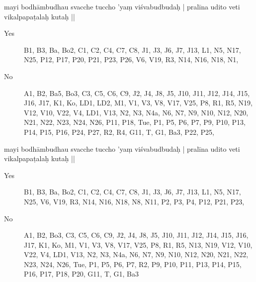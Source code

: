 \begin{ekdosis}
\begin{marma}[hp01_055]
 
mayi bodhāmbudhau svacche tuccho 'yaṃ viśvabudbudaḥ |
pralīna udito veti vikalpapaṭalaḥ kutaḥ ||

 \begin{description}
 \item[Yes] B1, B3, Ba, Bo2, C1, C2, C4, C7, C8, J1, J3, J6, J7, J13, L1, N5, N17, N25, P12, P17, P20, P21, P23, P26, V6, V19, R3, N14, N16, N18, N1, 

 \item[No] A1, B2, Ba5, Bo3, C3, C5, C6, C9, J2, J4, J8, J5, J10, J11, J12, J14, J15, J16, J17, K1, Ko, LD1, LD2, M1, V1, V3, V8, V17, V25, P8, R1, R5, N19, V12, V10, V22, V4, LD1, V13, N2, N3, N4a, N6, N7, N9, N10, N12, N20, N21, N22, N23, N24, N26, P11, P18, Tue, P1, P5, P6, P7, P9, P10, P13, P14, P15, P16, P24, P27, R2, R4, G11, T, G1, Ba3, P22, P25, 
    \end{description}

 
mayi bodhāmbudhau svacche tuccho 'yaṃ viśvabudbudaḥ |
pralīna udito veti vikalpapaṭalaḥ kutaḥ ||

\begin{description}
\item[Yes] B1, B3, Ba, Bo2, C1, C2, C4, C7, C8, J1, J3, J6, J7, J13, L1, N5, N17, N25, V6, V19, R3, N14, N16, N18, N8, N11, P2, P3, P4, P12, P21, P23, 
\item[No] A1, B2, Bo3, C3, C5, C6, C9, J2, J4, J8, J5, J10, J11, J12, J14, J15, J16, J17, K1, Ko, M1, V1, V3, V8, V17, V25, P8, R1, R5, N13, N19, V12, V10, V22, V4, LD1, V13, N2, N3, N4a, N6, N7, N9, N10, N12, N20, N21, N22, N23, N24, N26, Tue, P1, P5, P6, P7, R2, P9, P10, P11, P13, P14, P15, P16, P17, P18, P20, G11, T, G1, Ba3
    \end{description}



\end{marma}
\end{ekdosis}
